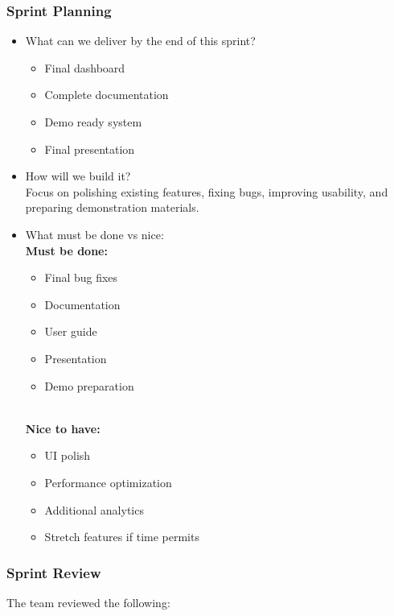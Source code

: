 \documentclass{article}
\begin{document}
\subsubsection{Sprint Planning}

\begin{itemize}
    \item What can we deliver by the end of this sprint? 
    \begin{itemize}
    \item Final dashboard
    \item Complete documentation
    \item Demo ready system
    \item Final presentation
    \end{itemize}

   
    \item How will we build it? 
    \\ Focus on polishing existing features, fixing bugs, improving usability, and preparing demonstration materials.

  
    \item What must be done vs nice:
    \\\textbf{Must be done:}
    
    \begin{itemize}
    \item Final bug fixes
    \item Documentation
    \item User guide
    \item Presentation
    \item Demo preparation
    \end{itemize}
    
    \\\textbf{Nice to have:}
    \begin{itemize}
    \item UI polish
    \item Performance optimization
    \item Additional analytics
    \item Stretch features if time permits
    \end{itemize}
    
\end{itemize}

\subsubsection{Sprint Review}
The team reviewed the following:
\end{document}

